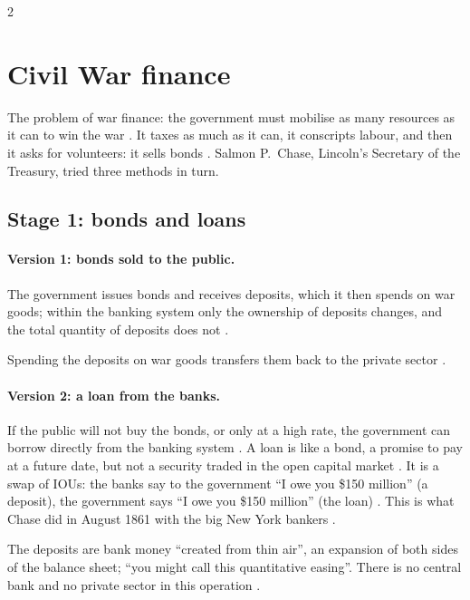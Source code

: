 \begin{paracol}{2}
\section{Civil War finance}\label{sec:st-civilwar}

The problem of war finance: the government must mobilise as many resources as it can to win the war .
It taxes as much as it can, it conscripts labour, and then it asks for volunteers: it sells bonds .
Salmon P.~Chase, Lincoln's Secretary of the Treasury, tried three methods in turn.

\subsection{Stage 1: bonds and loans}
\paragraph{Version 1: bonds sold to the public.} The government issues bonds and receives deposits, which it then spends on war
goods; within the banking system only the ownership of deposits changes, and the total quantity of deposits does not
.
\begin{taccts}
\quad
{}\quad
{}
\end{taccts}
Spending the deposits on war goods transfers them back to the private sector .

\paragraph{Version 2: a loan from the banks.} If the public will not buy the bonds, or only at a high rate, the government can
borrow directly from the banking system . A loan is like a bond, a promise to pay at a future date,
but not a security traded in the open capital market . It is a swap of IOUs: the banks say to the government ``I
owe you \$150 million'' (a deposit), the government says ``I owe you \$150 million'' (the loan) . This
is what Chase did in August 1861 with the big New York bankers .
\begin{taccts}
\qquad
{}
\end{taccts}
The deposits are bank money ``created from thin air'', an expansion of both sides of the balance sheet; ``you might call this
quantitative easing''. There is no central bank and no private sector in this operation .


\end{paracol}
